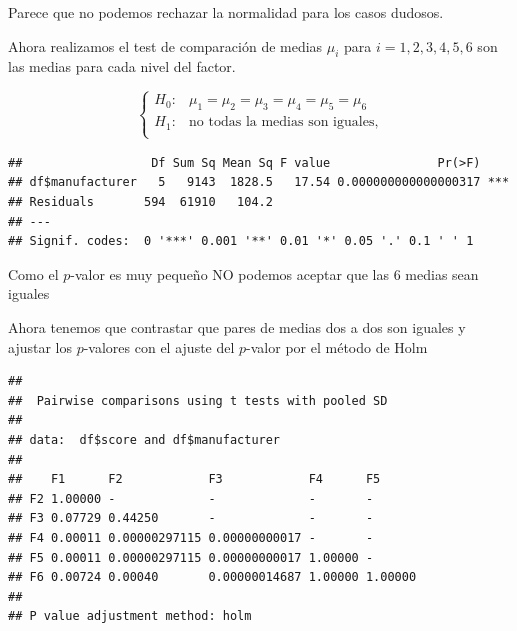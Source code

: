 \documentclass[
]{article}
\newenvironment{Shaded}{\begin{snugshade}}{\end{snugshade}}
\newcommand{\DataTypeTok}[1]{\textcolor[rgb]{0.13,0.29,0.53}{#1}}
\newcommand{\KeywordTok}[1]{\textcolor[rgb]{0.13,0.29,0.53}{\textbf{#1}}}
\newcommand{\NormalTok}[1]{#1}
\newcommand{\OperatorTok}[1]{\textcolor[rgb]{0.81,0.36,0.00}{\textbf{#1}}}
\newcommand{\StringTok}[1]{\textcolor[rgb]{0.31,0.60,0.02}{#1}}
\begin{document}
Parece que no podemos rechazar la normalidad para los casos dudosos.

Ahora realizamos el test de comparación de medias \(\mu_i\) para
\(i=1,2,3,4,5,6\) son las medias para cada nivel del factor.

\[
\left\{
\begin{array}{ll}
H_0: & \mu_1=\mu_2=\mu_3=\mu_4=\mu_5=\mu_6\\
H_1: & \mbox{no todas la medias son iguales,}\\
\end{array}
\right.
\]

\begin{Shaded}
\end{Shaded}

\begin{verbatim}
##                  Df Sum Sq Mean Sq F value               Pr(>F)    
## df$manufacturer   5   9143  1828.5   17.54 0.000000000000000317 ***
## Residuals       594  61910   104.2                                 
## ---
## Signif. codes:  0 '***' 0.001 '**' 0.01 '*' 0.05 '.' 0.1 ' ' 1
\end{verbatim}

Como el \(p\)-valor es muy pequeño NO podemos aceptar que las 6 medias
sean iguales

Ahora tenemos que contrastar que pares de medias dos a dos son iguales y
ajustar los \(p\)-valores con el ajuste del \(p\)-valor por el método de
Holm

\begin{Shaded}
\end{Shaded}

\begin{verbatim}
## 
##  Pairwise comparisons using t tests with pooled SD 
## 
## data:  df$score and df$manufacturer 
## 
##    F1      F2            F3            F4      F5     
## F2 1.00000 -             -             -       -      
## F3 0.07729 0.44250       -             -       -      
## F4 0.00011 0.00000297115 0.00000000017 -       -      
## F5 0.00011 0.00000297115 0.00000000017 1.00000 -      
## F6 0.00724 0.00040       0.00000014687 1.00000 1.00000
## 
## P value adjustment method: holm
\end{verbatim}
\end{document}

